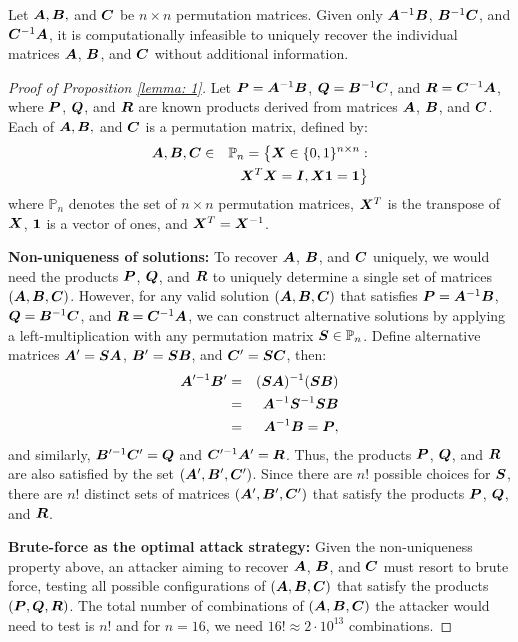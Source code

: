 \begin{proposition}
    Let ${\bm{A}}, {\bm{B}},$ and ${\bm{C}}$ be $n \times n$ permutation matrices. Given only ${\bm{A}}^{-1}{\bm{B}}$, ${\bm{B}}^{-1}{\bm{C}}$, and ${\bm{C}}^{-1}{\bm{A}}$, it is computationally infeasible to uniquely recover the individual matrices ${\bm{A}}$, ${\bm{B}}$, and ${\bm{C}}$ without additional information. 
    \label{lemma: 1}
\end{proposition}

\begin{proof}[Proof of Proposition \ref{lemma: 1}]
    Let ${\bm{P}} = {\bm{A}}^{-1}{\bm{B}}$, ${\bm{Q}} = {\bm{B}}^{-1}{\bm{C}}$, and ${\bm{R}}={\bm{C}}^{-1}{\bm{A}}$, where ${\bm{P}}$, ${\bm{Q}}$, and ${\bm{R}}$ are known products derived from matrices ${\bm{A}}$, ${\bm{B}}$, and ${\bm{C}}$. Each of ${\bm{A}}, {\bm{B}},$ and ${\bm{C}}$ is a permutation matrix, defined by: 
    \begin{eqnarray}
        {\bm{A}}, {\bm{B}}, {\bm{C}} &\in& \mathbb{P}_n = \big\{ {\bm{X}} \in \{0,1\}^{n \times n}: \nonumber \\ 
        && {\bm{X}}^T{\bm{X}}={\bm{I}}, {\bm{X}} {\bm{1}} = {\bm{1}} \big\} 
    \end{eqnarray}
    where $\mathbb{P}_n$ denotes the set of $n \times n$ permutation matrices, ${\bm{X}}^T$ is the transpose of ${\bm{X}}$, ${\bm{1}}$ is a vector of ones, and ${\bm{X}}^T={\bm{X}}^{-1}$. 

    \noindent\textbf{Non-uniqueness of solutions:} To recover ${\bm{A}}$, ${\bm{B}}$, and ${\bm{C}}$ uniquely, we would need the products ${\bm{P}}$, ${\bm{Q}}$, and ${\bm{R}}$ to uniquely determine a single set of matrices $({\bm{A}}, {\bm{B}}, {\bm{C}})$. However, for any valid solution $({\bm{A}}, {\bm{B}}, {\bm{C}})$ that satisfies ${\bm{P}} = {\bm{A}}^{-1}{\bm{B}}$, ${\bm{Q}} = {\bm{B}}^{-1}{\bm{C}}$, and ${\bm{R}}={\bm{C}}^{-1}{\bm{A}}$, we can construct alternative solutions by applying a left-multiplication with any permutation matrix ${\bm{S}} \in \mathbb{P}_n$. Define alternative matrices ${\bm{A}}^{\prime} = {\bm{S}}{\bm{A}}$, ${\bm{B}}^{\prime} = {\bm{S}}{\bm{B}}$, and ${\bm{C}}^{\prime} = {\bm{S}}{\bm{C}}$, then: 
    \begin{eqnarray}
        {\bm{A}}^{\prime -1} {\bm{B}}^{\prime} &=& ({\bm{S}}{\bm{A}})^{-1} ({\bm{S}}{\bm{B}}) \nonumber \\ 
        &=& {\bm{A}}^{-1}{\bm{S}}^{-1} {\bm{S}}{\bm{B}} \nonumber \\ 
        &=& {\bm{A}}^{-1}{\bm{B}} = {\bm{P}}, 
    \end{eqnarray}
    and similarly, ${\bm{B}}^{\prime -1}{\bm{C}}^{\prime} = {\bm{Q}}$ and ${\bm{C}}^{\prime -1}{\bm{A}}^{\prime} = {\bm{R}}$. 
    Thus, the products ${\bm{P}}$, ${\bm{Q}}$, and ${\bm{R}}$ are also satisfied by the set $({\bm{A}}^{\prime}, {\bm{B}}^{\prime}, {\bm{C}}^{\prime})$. Since there are $n!$ possible choices for ${\bm{S}}$, there are $n!$ distinct sets of matrices $({\bm{A}}^{\prime}, {\bm{B}}^{\prime}, {\bm{C}}^{\prime})$ that satisfy the products ${\bm{P}}$, ${\bm{Q}}$, and ${\bm{R}}$. 

    \noindent\textbf{Brute-force as the optimal attack strategy:} Given the non-uniqueness property above, an attacker aiming to recover ${\bm{A}}$, ${\bm{B}}$, and ${\bm{C}}$ must resort to brute force, testing all possible configurations of $({\bm{A}}, {\bm{B}}, {\bm{C}})$ that satisfy the products $({\bm{P}}, {\bm{Q}}, {\bm{R}})$. The total number of combinations of $({\bm{A}}, {\bm{B}}, {\bm{C}})$ the attacker would need to test is $n!$ and for $n=16$, we need $16! \approx 2 \cdot 10^{13}$ combinations. 
    
\end{proof}


